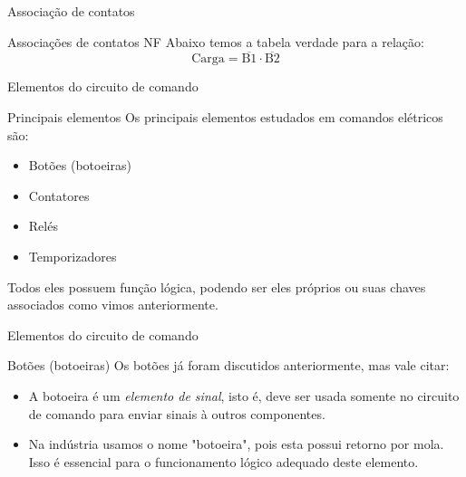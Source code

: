 \begin{frame}{Associação de contatos}
\begin{block}{Associações de contatos NF}
Abaixo temos a tabela verdade para a relação:
$$ \text{Carga} = \overline{\text{B}1}\cdot\overline{\text{B}2} $$
\end{block}

\vspace{0.3cm}

\begin{table}[h]
\end{table}
\end{frame}


\begin{frame}{Elementos do circuito de comando}
\begin{block}{Principais elementos}
	Os principais elementos estudados em comandos elétricos são:
	\begin{itemize}
		\item Botões (botoeiras)
		\item Contatores
		\item Relés
		\item Temporizadores
	\end{itemize}
	Todos eles possuem função lógica, podendo ser eles próprios ou suas chaves associados como vimos anteriormente.
\end{block}
\end{frame}


\begin{frame}{Elementos do circuito de comando}
\begin{block}{Botões (botoeiras)}
	Os botões já foram discutidos anteriormente, mas vale citar:
	\begin{itemize}
		\item A botoeira é um \textit{elemento de sinal}, isto é, deve ser usada somente no circuito de comando para enviar sinais à outros componentes.
		\item Na indústria usamos o nome "botoeira", pois esta possui retorno por mola. Isso é essencial para o funcionamento lógico adequado deste elemento. 
	\end{itemize}
\end{block}
\end{frame}


